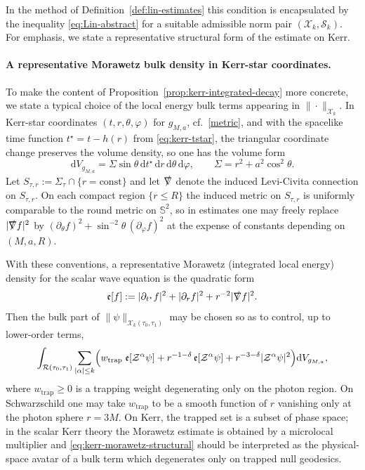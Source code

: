 \documentclass[11pt]{article}
\numberwithin{equation}{section}
\theoremstyle{plain}
\theoremstyle{definition}
\theoremstyle{remark}
\newcommand{\dd}{\mathrm{d}}
\begin{document}
In the method of Definition~\ref{def:lin-estimates} this condition is encapsulated by the inequality \eqref{eq:Lin-abstract} for a suitable admissible norm pair $(\mathcal X_{k},\mathcal S_{k})$.
For emphasis, we state a representative structural form of the estimate on Kerr.

\paragraph{A representative Morawetz bulk density in Kerr-star coordinates.}
To make the content of Proposition~\ref{prop:kerr-integrated-decay} more concrete, we state a typical choice of the local energy bulk terms appearing in $\|\cdot\|_{\mathcal X_{k}}$.
In Kerr-star coordinates $(t,r,\theta,\varphi)$ for $g_{M,a}$, cf.~\eqref{metric}, and with the spacelike time function $t^{\star}=t-h(r)$ from \eqref{eq:kerr-tstar}, the triangular coordinate change preserves the volume density, so one has the volume form
\begin{equation}
\dd V_{g_{M,a}}=\Sigma\sin\theta\,\dd t^{\star}\,\dd r\,\dd\theta\,\dd\varphi,
\qquad
\Sigma=r^{2}+a^{2}\cos^{2}\theta.
\end{equation}
Let $S_{\tau,r}:=\Sigma_{\tau}\cap\{r=\mathrm{const}\}$ and let $\slashed{\nabla}$ denote the induced Levi-Civita connection on $S_{\tau,r}$.
On each compact region $\{r\le R\}$ the induced metric on $S_{\tau,r}$ is uniformly comparable to the round metric on $\mathbb S^{2}$, so in estimates one may freely replace $|\slashed{\nabla}f|^{2}$ by $(\partial_{\theta}f)^{2}+\sin^{-2}\theta\,(\partial_{\varphi}f)^{2}$ at the expense of constants depending on $(M,a,R)$.

With these conventions, a representative Morawetz (integrated local energy) density for the scalar wave equation is the quadratic form
\begin{equation}
\mathfrak e[f]
:=
|\partial_{t^{\star}}f|^{2}
+
|\partial_{r}f|^{2}
+
r^{-2}|\slashed{\nabla}f|^{2}.
\end{equation}
Then the bulk part of $\|\psi\|_{\mathcal X_{k}(\tau_{0},\tau_{1})}$ may be chosen so as to control, up to lower-order terms,
\begin{equation}\label{eq:kerr-morawetz-structural}
\int_{\mathcal R(\tau_{0},\tau_{1})}\sum_{|\alpha|\le k}\Bigl(
w_{\mathrm{trap}}\;\mathfrak e[\mathcal Z^{\alpha}\psi]
+r^{-1-\delta}\,\mathfrak e[\mathcal Z^{\alpha}\psi]
+r^{-3-\delta}|\mathcal Z^{\alpha}\psi|^{2}
\Bigr)\dd V_{g_{M,a}},
\end{equation}
where $w_{\mathrm{trap}}\ge0$ is a trapping weight degenerating only on the photon region.
On Schwarzschild one may take $w_{\mathrm{trap}}$ to be a smooth function of $r$ vanishing only at the photon sphere $r=3M$.
On Kerr, the trapped set is a subset of phase space; in the scalar Kerr theory the Morawetz estimate is obtained by a microlocal multiplier and \eqref{eq:kerr-morawetz-structural} should be interpreted as the physical-space avatar of a bulk term which degenerates only on trapped null geodesics.
\end{document}

